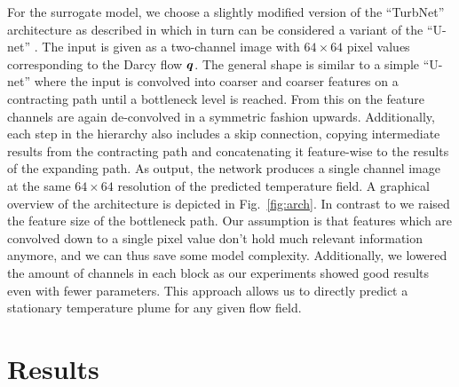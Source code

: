 \documentclass{article} %
\begin{document}
For the surrogate model, we choose a slightly modified version of the ``TurbNet'' architecture as described in \citet{Thuerey2019} which in turn can be considered a variant of the ``U-net'' \citep{Ronneberger2015}.
The input is given as a two-channel image with $64\times64$ pixel values corresponding to the Darcy flow ${\bm{q}}$.
The general shape is similar to a simple ``U-net'' where the input is convolved into coarser and coarser features on a contracting path until a bottleneck level is reached. 
From this on the feature channels are again de-convolved in a symmetric fashion upwards.
Additionally, each step in the hierarchy also includes a skip connection, copying intermediate results from the contracting path and concatenating it feature-wise to the results of the expanding path.
As output, the network produces a single channel image at the same $64\times64$ resolution of the predicted temperature field.
A graphical overview of the architecture is depicted in Fig.~\ref{fig:arch}.
In contrast to \citep{Thuerey2019} we raised the feature size of the bottleneck path.
Our assumption is that features which are convolved down to a single pixel value don't hold much relevant information anymore, and we can thus save some model complexity.
Additionally, we lowered the amount of channels in each block as our experiments showed good results even with fewer parameters.
This approach allows us to directly predict a stationary temperature plume for any given flow field.



\section{Results}
\label{sec:results}

\end{document}
